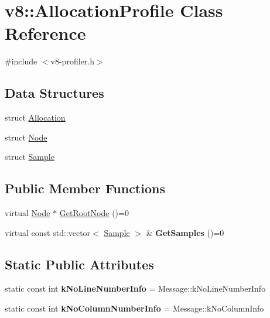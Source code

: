 \hypertarget{classv8_1_1AllocationProfile}{}\section{v8\+:\+:Allocation\+Profile Class Reference}
\label{classv8_1_1AllocationProfile}


{\ttfamily \#include $<$v8-\/profiler.\+h$>$}

\subsection*{Data Structures}
\begin{DoxyCompactItemize}
\item 
struct \mbox{\hyperlink{structv8_1_1AllocationProfile_1_1Allocation}{Allocation}}
\item 
struct \mbox{\hyperlink{structv8_1_1AllocationProfile_1_1Node}{Node}}
\item 
struct \mbox{\hyperlink{structv8_1_1AllocationProfile_1_1Sample}{Sample}}
\end{DoxyCompactItemize}
\subsection*{Public Member Functions}
\begin{DoxyCompactItemize}
\item 
virtual \mbox{\hyperlink{structv8_1_1AllocationProfile_1_1Node}{Node}} $\ast$ \mbox{\hyperlink{classv8_1_1AllocationProfile_afea045dae30df5477088e2f0b7edb6c4}{Get\+Root\+Node}} ()=0
\item 
\mbox{\label{classv8_1_1AllocationProfile_a5dae5644e119c5c9ef699e27b98ab92d}} 
virtual const std\+::vector$<$ \mbox{\hyperlink{structv8_1_1AllocationProfile_1_1Sample}{Sample}} $>$ \& {\bfseries Get\+Samples} ()=0
\end{DoxyCompactItemize}
\subsection*{Static Public Attributes}
\begin{DoxyCompactItemize}
\item 
\mbox{\label{classv8_1_1AllocationProfile_a26fdfe9e4846d26c83d0ad8c2ed2d783}} 
static const int {\bfseries k\+No\+Line\+Number\+Info} = Message\+::k\+No\+Line\+Number\+Info
\item 
\mbox{\label{classv8_1_1AllocationProfile_a9cfa103f73e82629694eee3734826eb7}} 
static const int {\bfseries k\+No\+Column\+Number\+Info} = Message\+::k\+No\+Column\+Info
\end{DoxyCompactItemize}


